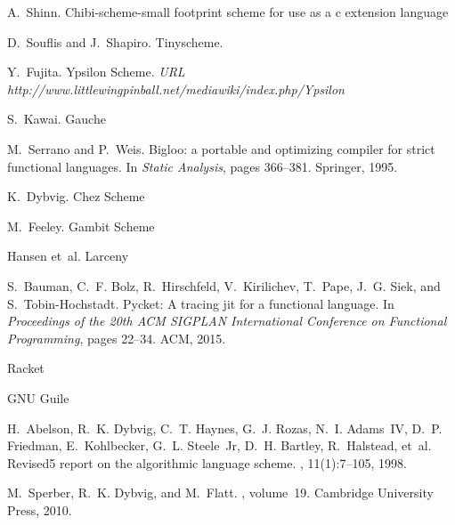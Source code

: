 \documentclass[preprint, numbers]{sigplanconf}
\begin{document}
\begin{thebibliography}{}
\softraggedright

 A.~Shinn.  \newblock{}Chibi-scheme-small footprint
  scheme for use as a c extension language 

 D.~Souflis and J.~Shapiro.  \newblock
  Tinyscheme.  

 Y.~Fujita.  \newblock Ypsilon Scheme. \newblock
  {\em URL http://www.littlewingpinball.net/mediawiki/index.php/Ypsilon}

 S.~Kawai. \newblock Gauche 

M.~Serrano and P.~Weis.
\newblock Bigloo: a portable and optimizing compiler for strict functional
  languages.
\newblock In {\em Static Analysis}, pages 366--381. Springer, 1995.

 K.~Dybvig. \newblock Chez Scheme

 M.~Feeley. \newblock Gambit Scheme

 Hansen et~al. \newblock Larceny

 S.~Bauman,
  C.~F. Bolz, R.~Hirschfeld, V.~Kirilichev, T.~Pape, J.~G. Siek, and
  S.~Tobin-Hochstadt.  \newblock Pycket: A tracing jit for a functional
  language.  \newblock In {\em Proceedings of the 20th ACM SIGPLAN
    International Conference on Functional Programming}, pages 22--34. ACM,
  2015.

 \newblock Racket 

 \newblock GNU Guile

H.~Abelson, R.~K. Dybvig, C.~T. Haynes, G.~J. Rozas, N.~I. Adams~IV, D.~P.
  Friedman, E.~Kohlbecker, G.~L. Steele~Jr, D.~H. Bartley, R.~Halstead, et~al.
\newblock Revised5 report on the algorithmic language scheme.
, 11(1):7--105, 1998.

 M.~Sperber, R.~K. Dybvig, and M.~Flatt.
  ,
  volume~19.  \newblock Cambridge University Press, 2010.


\end{thebibliography}
\end{document}
